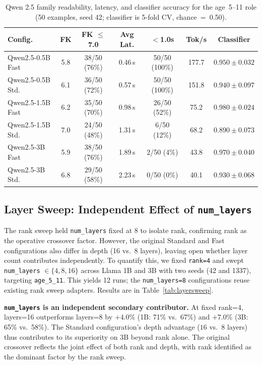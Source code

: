 \documentclass[ASNA,twocolumn]{USG} %
\begin{document}
\begin{table}[!t]
  \centering
  \caption{Qwen 2.5 family readability, latency, and classifier accuracy for the age~5--11 role (50 examples, seed 42; classifier is 5-fold CV, chance~=~0.50).}
  \label{tab:qwen25}
  \footnotesize
  \begin{tabular}{lcccccc}
    \hline
    Config. & FK & FK $\leq$7.0 & Avg Lat. & $<$1.0s & Tok/s & Classifier \\
    \hline
    Qwen2.5-0.5B Fast & 5.8 & 38/50 (76\%) & 0.46\,s & 50/50 (100\%) & 177.7 & $0.950 \pm 0.032$ \\
    Qwen2.5-0.5B Std. & 6.1 & 36/50 (72\%) & 0.57\,s & 50/50 (100\%) & 151.8 & $0.940 \pm 0.097$ \\
    Qwen2.5-1.5B Fast & 6.2 & 35/50 (70\%) & 0.98\,s & 26/50 (52\%)  & 75.2  & $\mathbf{0.980 \pm 0.024}$ \\
    Qwen2.5-1.5B Std. & 7.0 & 24/50 (48\%) & 1.31\,s & 6/50 (12\%)   & 68.2  & $0.890 \pm 0.073$ \\
    Qwen2.5-3B Fast   & 5.9 & 38/50 (76\%) & 1.89\,s & 2/50 (4\%)    & 43.8  & $0.970 \pm 0.040$ \\
    Qwen2.5-3B Std.   & 6.8 & 29/50 (58\%) & 2.23\,s & 0/50 (0\%)    & 40.1  & $0.930 \pm 0.068$ \\
    \hline
  \end{tabular}
\end{table}

\subsection{Layer Sweep: Independent Effect of \texttt{num\_layers}}\label{sec:layersweep}

The rank sweep held \texttt{num\_layers} fixed at 8 to isolate rank, confirming rank as the operative crossover factor. However, the original Standard and Fast configurations also differ in depth (16 vs.\ 8 layers), leaving open whether layer count contributes independently. To quantify this, we fixed \texttt{rank=4} and swept \texttt{num\_layers} $\in \{4, 8, 16\}$ across Llama 1B and 3B with two seeds (42 and 1337), targeting \texttt{age\_5\_11}. This yields 12 runs; the \texttt{num\_layers=8} configurations reuse existing rank sweep adapters. Results are in Table~\ref{tab:layersweep}.

\textbf{\texttt{num\_layers} is an independent secondary contributor.} At fixed rank=4, layers=16 outperforms layers=8 by $+4.0\%$ (1B: 71\% vs.\ 67\%) and $+7.0\%$ (3B: 65\% vs.\ 58\%). The Standard configuration's depth advantage ($16$ vs.\ $8$ layers) thus contributes to its superiority on 3B beyond rank alone. The original crossover reflects the joint effect of both rank and depth, with rank identified as the dominant factor by the rank sweep.
\end{document}
